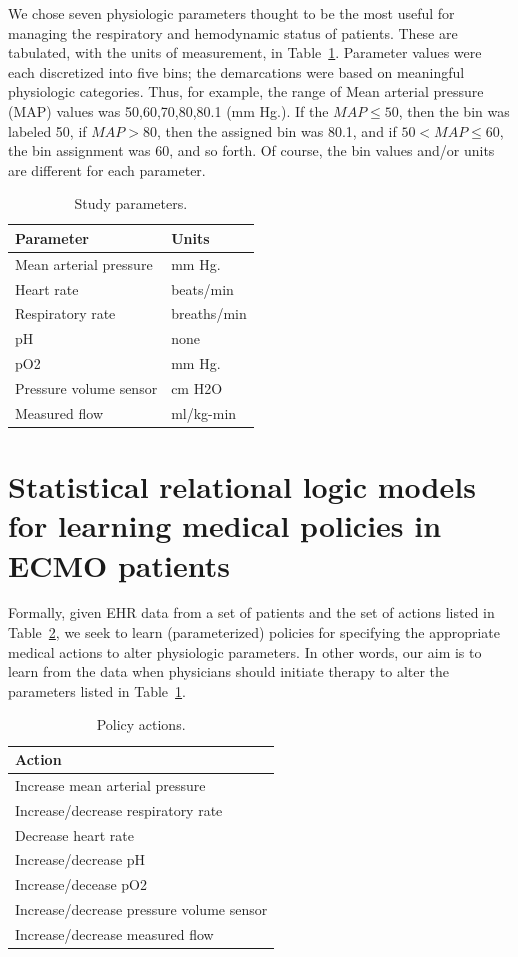 \documentclass[letterpaper]{article} %
\begin{document}
We chose seven physiologic parameters thought to be the most useful for managing the respiratory and hemodynamic status of patients. These are tabulated, with the units of measurement, in Table~\ref{tab:paramList}. Parameter values were each discretized into five bins; the demarcations were based on meaningful physiologic categories. Thus, for example, the range of Mean arterial pressure (MAP) values was {50,60,70,80,80.1} (mm Hg.). If the $MAP \leq 50$, then the bin was labeled 50, if $MAP> 80$, then the assigned bin was 80.1, and if $50< MAP \leq 60$, the bin assignment was 60, and so forth. Of course, the bin values and/or units are different for each parameter.
\begin{table}
\centering
\caption{Study parameters.}
\label{tab:paramList}
\begin{tabular}{|l|l|}
\hline
Parameter &  Units\\
\hline
Mean arterial pressure & mm Hg.\\
Heart rate & beats/min\\
Respiratory rate & breaths/min\\
pH & none\\
pO2 & mm Hg.\\
Pressure volume sensor & cm H2O\\
Measured flow & ml/kg-min\\
\hline
\end{tabular}
\end{table}

\section{Statistical relational logic models for learning medical policies in ECMO patients}

Formally, given EHR data from a set of patients and the set of actions listed in Table~\ref{tab:actionList}, we seek to learn (parameterized) policies for specifying the appropriate medical actions to alter physiologic parameters. In other words, our aim is to learn from the data when physicians should initiate therapy to alter the parameters listed in Table~\ref{tab:paramList}.
\begin{table}
\centering
\caption{Policy actions.}\label{tab:actionList}
\begin{tabular}{|l|}
\hline
Action\\
\hline
Increase mean arterial pressure\\
Increase/decrease respiratory rate\\
Decrease heart rate\\
Increase/decrease pH\\
Increase/decease pO2\\
Increase/decrease pressure volume sensor\\
Increase/decrease measured flow\\
\hline
\end{tabular}
\end{table}
\end{document}
